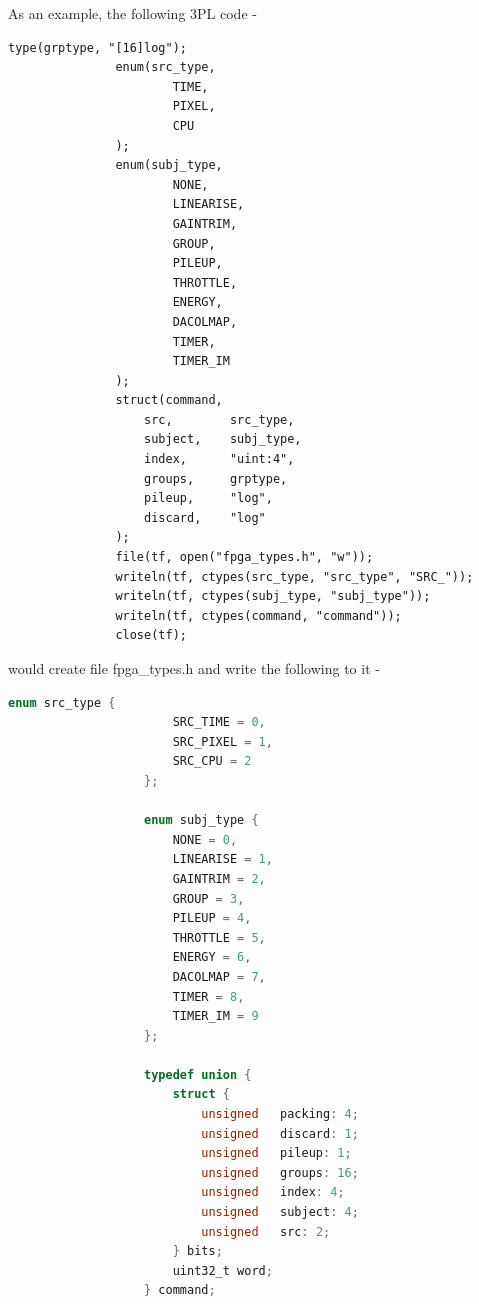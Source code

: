             As an example, the following 3PL code -
            \begin{lstlisting}[gobble=12, language=threepl]
               type(grptype, "[16]log");
               enum(src_type,
                       TIME,
                       PIXEL,
                       CPU
               );
               enum(subj_type,
                       NONE,
                       LINEARISE,
                       GAINTRIM,
                       GROUP,
                       PILEUP,
                       THROTTLE,
                       ENERGY,
                       DACOLMAP,
                       TIMER,
                       TIMER_IM 
               );
               struct(command,
                   src,        src_type,
                   subject,    subj_type,
                   index,      "uint:4",
                   groups,     grptype, 
                   pileup,     "log",
                   discard,    "log"
               );
               file(tf, open("fpga_types.h", "w"));
               writeln(tf, ctypes(src_type, "src_type", "SRC_"));
               writeln(tf, ctypes(subj_type, "subj_type"));
               writeln(tf, ctypes(command, "command"));
               close(tf);
            \end{lstlisting}
            
            would create file fpga\_types.h and write the following to it -
            \begin{lstlisting}[gobble=12, language=C]
                   enum src_type {
                       SRC_TIME = 0,
                       SRC_PIXEL = 1,
                       SRC_CPU = 2
                   };

                   enum subj_type {
                       NONE = 0,
                       LINEARISE = 1,
                       GAINTRIM = 2,
                       GROUP = 3,
                       PILEUP = 4,
                       THROTTLE = 5,
                       ENERGY = 6,
                       DACOLMAP = 7,
                       TIMER = 8,
                       TIMER_IM = 9
                   };

                   typedef union {
                       struct {
                           unsigned   packing: 4;
                           unsigned   discard: 1;
                           unsigned   pileup: 1;
                           unsigned   groups: 16;
                           unsigned   index: 4;
                           unsigned   subject: 4;
                           unsigned   src: 2;
                       } bits;
                       uint32_t word;
                   } command;
            \end{lstlisting}

